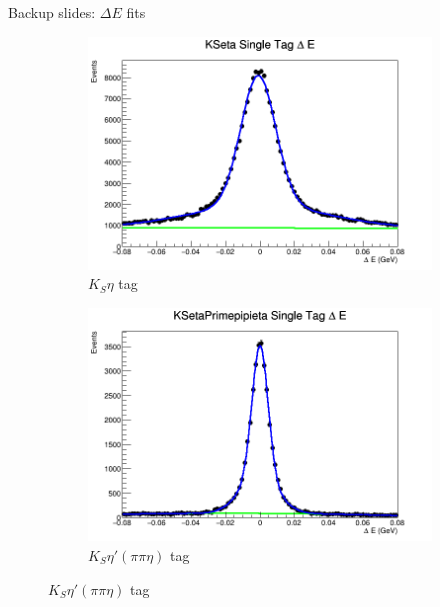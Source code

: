 \documentclass{beamer}
\begin{document}
\begin{frame}{Backup slides: $\Delta E$ fits}
  \begin{figure}
    \centering
    \vspace{-0.2cm}
    \begin{subfigure}{0.5\textwidth}
      \includegraphics[width = 1\textwidth]{KSetaDeltaE.png}
      \caption{$K_S\eta$ tag}
    \end{subfigure}%
    \begin{subfigure}{0.5\textwidth}
      \includegraphics[width = 1\textwidth]{KSetaPrimepipietaDeltaE.png}
      \caption{$K_S\eta'(\pi\pi\eta)$ tag}
    \end{subfigure}
  \end{figure}
\end{frame}
\end{document}
